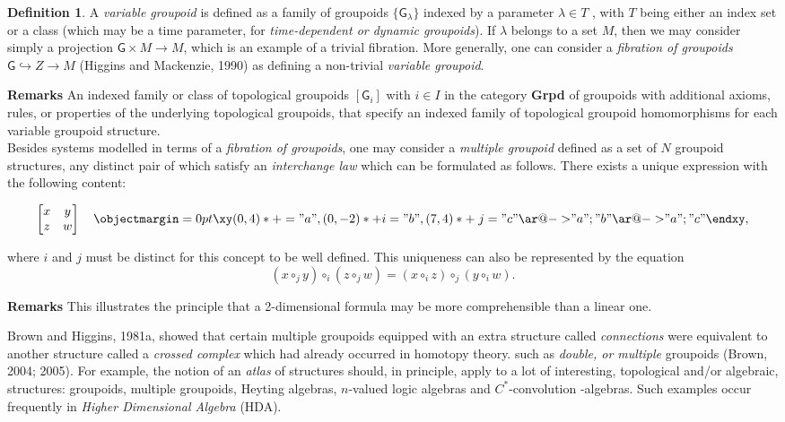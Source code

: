 \documentclass[12pt]{article}
\makeatletter
\newcommand{\directs}[2]{\def\objectstyle{\scriptstyle}  \objectmargin={0pt}
\xy
(0,4)*+{}="a",(0,-2)*+{\rule{0em}{1.5ex}#2}="b",(7,4)*+{\;#1}="c"
\ar@{->} "a";"b" \ar @{->}"a";"c" \endxy }
\theoremstyle{plain}
\theoremstyle{definition}
\newtheorem{definition}{Definition}[section]
\theoremstyle{plain}
\numberwithin{equation}{section}
\newcommand{\grp}{\mathsf{G}}
\newcommand{\lra}{{\longrightarrow}}
\makeatother
\begin{document}
\begin{definition}  
A \emph{variable groupoid} is defined as a family of groupoids
$\{\mathsf{G}_{\lambda}\}$ indexed by a parameter $\lambda \in T$ , with $T$ being either an index set or a class (which may be a time parameter, for \emph{time-dependent or dynamic groupoids}).  If $\lambda$ belongs to a set $M$, then we may consider simply a projection $\mathsf{G} \times M \lra M$, which is an
example of a trivial fibration. More generally, one can consider a \emph{fibration of groupoids} $\mathsf{G} \hookrightarrow Z \lra M$ (Higgins and Mackenzie, 1990) as defining a non-trivial \emph{variable groupoid}.
\end{definition}

\textbf{Remarks}
An indexed family or class of topological groupoids $[\grp_i]$ with $i \in I$ in the category \textbf{Grpd} of groupoids
with additional axioms, rules, or properties of the underlying topological groupoids, 
that specify an indexed family of topological groupoid homomorphisms for each variable groupoid
structure.\\

Besides systems modelled in terms of a \emph{fibration of groupoids},
one may consider a \emph{multiple groupoid} defined as a set of $N$
groupoid structures, any distinct pair of which satisfy an
{\it interchange law} which can be formulated as follows.
There exists a unique expression with the following content:

\begin{equation}
\begin{bmatrix}
x&y \\z&w
\end{bmatrix}\quad \directs{j}{i},
\end{equation}

where $i$ and $j$ must be distinct for this concept to be well defined.
This uniqueness can also be represented by the equation
\begin{equation}
(x\circ_j y)\circ_i(z \circ_j w)= (x\circ_i z)\circ_j(y \circ_i
w).
\end{equation}

\textbf{Remarks}
  This illustrates the principle that a 2-dimensional formula may be
more comprehensible than a linear one.

 Brown and Higgins, 1981a, showed that certain multiple groupoids
equipped with an extra structure called \emph{connections} were
equivalent to another structure called a \emph{crossed complex}
which had already occurred in homotopy theory. such as
\emph{double, or multiple} groupoids (Brown, 2004; 2005). 
For example, the notion of an \emph{atlas} of structures should,
in principle, apply to a lot of interesting, topological and/or
algebraic, structures: groupoids, multiple groupoids, Heyting
algebras, $n$-valued logic algebras and $C^*$-convolution
-algebras. Such examples occur frequently in \emph{Higher Dimensional Algebra}
(HDA). 


\end{document}
